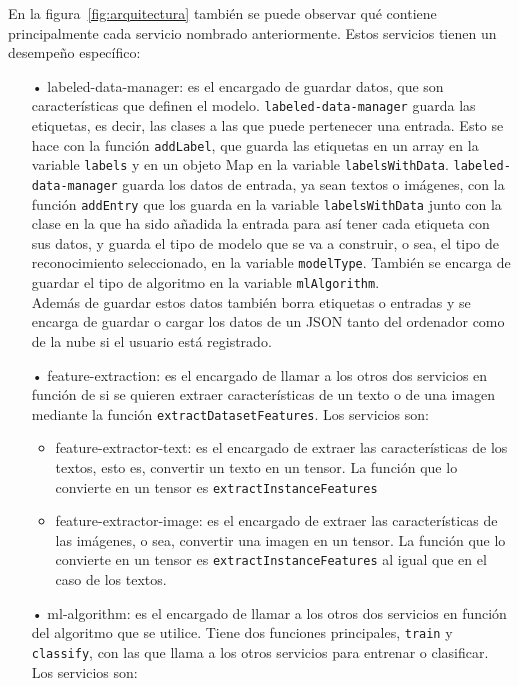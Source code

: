 \documentclass[a4paper, 12pt]{book}
\begin{document}
En la figura~\ref{fig:arquitectura} también se puede observar qué contiene principalmente cada servicio nombrado anteriormente. Estos servicios tienen un desempeño específico:

\begin{itemize}
	\item[•] labeled-data-manager: es el encargado de guardar datos, que son características que definen el modelo. \texttt{labeled-data-manager} guarda las etiquetas, es decir, las clases a las que puede pertenecer una entrada. Esto se hace con la función \texttt{addLabel}, que guarda las etiquetas en un array en la variable \texttt{labels} y en un objeto Map en la variable \texttt{labelsWithData}. 
	\texttt{labeled-data-manager} guarda los datos de entrada, ya sean textos o imágenes, con la función \texttt{addEntry} que los guarda en la variable \texttt{labelsWithData} junto con la clase en la que ha sido añadida la entrada para así tener cada etiqueta con sus datos, y guarda el tipo de modelo que se va a construir, o sea, el tipo de reconocimiento seleccionado, en la variable \texttt{modelType}. También se encarga de guardar el tipo de algoritmo en la variable \texttt{mlAlgorithm}. \\
	Además de guardar estos datos también borra etiquetas o entradas y se encarga de guardar o cargar los datos de un JSON tanto del ordenador como de la nube si el usuario está registrado.
	
	\item[•] feature-extraction: es el encargado de llamar a los otros dos servicios en función de si se quieren extraer características de un texto o de una imagen mediante la función \texttt{extractDatasetFeatures}. Los servicios son:
	
	\begin{itemize}
		\item feature-extractor-text: es el encargado de extraer las características de los textos, esto es, convertir un texto en un tensor. 
		La función que lo convierte en un tensor es \texttt{extractInstanceFeatures}
		
		\item feature-extractor-image: es el encargado de extraer las características de las imágenes, o sea, convertir una imagen en un tensor. 
		La función que lo convierte en un tensor es \texttt{extractInstanceFeatures} al igual que en el caso de los textos.
	\end{itemize}
	
	\item[•] ml-algorithm: es el encargado de llamar a los otros dos servicios en función del algoritmo que se utilice. 
	Tiene dos funciones principales, \texttt{train} y \texttt{classify}, con las que llama a los otros servicios para entrenar o clasificar. Los servicios son:
	

\end{itemize}
\end{document}
